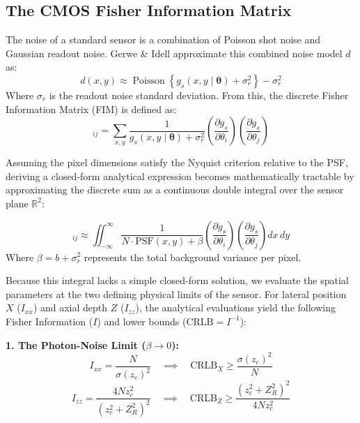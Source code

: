 \documentclass[11pt]{article}
\begin{document}
\subsection{The CMOS Fisher Information Matrix}
The noise of a standard sensor is a combination of Poisson shot noise and Gaussian readout noise. Gerwe \& Idell approximate this combined noise model $d$ as: 
\begin{equation}
d(x, y) \approx \operatorname{Poisson}\left\{ g_s(x, y \mid \bm{\theta}) + \sigma_r^2 \right\} - \sigma_r^2
\end{equation}
Where $\sigma_r$ is the readout noise standard deviation. From this, the discrete Fisher Information Matrix (FIM) is defined as:
\begin{equation}
[F(\bm{\theta})]_{ij} = \sum_{x,y} \frac{1}{g_s(x,y \mid \bm{\theta}) + \sigma_r^2} \left( \frac{\partial g_s}{\partial \theta_i} \right) \left( \frac{\partial g_s}{\partial \theta_j} \right)
\end{equation}

Assuming the pixel dimensions satisfy the Nyquist criterion relative to the PSF, deriving a closed-form analytical expression becomes mathematically tractable by approximating the discrete sum as a continuous double integral over the sensor plane $\mathbb{R}^2$:

\begin{equation}
[F(\bm{\theta})]_{ij} \approx \iint_{-\infty}^{\infty} \frac{1}{N \cdot \text{PSF}(x,y) + \beta} \left( \frac{\partial g_s}{\partial \theta_i} \right) \left( \frac{\partial g_s}{\partial \theta_j} \right) dx \, dy
\end{equation}
Where $\beta = b + \sigma_r^2$ represents the total background variance per pixel. 

Because this integral lacks a simple closed-form solution, we evaluate the spatial parameters at the two defining physical limits of the sensor. For lateral position $X$ ($I_{xx}$) and axial depth $Z$ ($I_{zz}$), the analytical evaluations yield the following Fisher Information ($I$) and lower bounds ($\text{CRLB} = I^{-1}$):

\vspace{0.5em}
\noindent \textbf{1. The Photon-Noise Limit ($\beta \to 0$):}
\begin{equation}
I_{xx} = \frac{N}{\sigma(z_c)^2} \quad \implies \quad \text{CRLB}_X \ge \frac{\sigma(z_c)^2}{N}
\end{equation}
\begin{equation}
I_{zz} = \frac{4 N z_c^2}{(z_c^2 + Z_R^2)^2} \quad \implies \quad \text{CRLB}_Z \ge \frac{(z_c^2 + Z_R^2)^2}{4 N z_c^2}
\end{equation}
\end{document}
